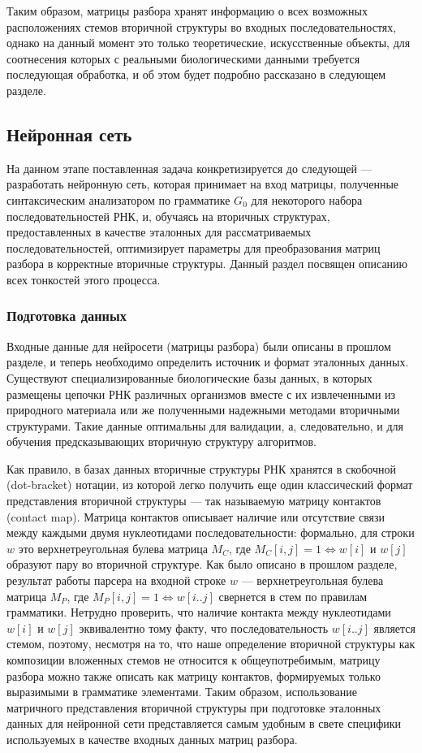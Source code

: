 Таким образом, матрицы разбора хранят информацию о всех возможных расположениях стемов вторичной структуры во входных последовательностях, однако на данный момент это только теоретические, искусственные объекты, для соотнесения которых с реальными биологическими данными требуется последующая обработка, и об этом будет подробно рассказано в следующем разделе.

\subsection{Нейронная сеть}
На данном этапе поставленная задача конкретизируется до следующей --- разработать нейронную сеть, которая принимает на вход матрицы, полученные синтаксическим анализатором по грамматике $G_0$ для некоторого набора последовательностей РНК, и, обучаясь на вторичных структурах, предоставленных в качестве эталонных для рассматриваемых последовательностей, оптимизирует параметры для преобразования матриц разбора в корректные вторичные структуры. Данный раздел посвящен описанию всех тонкостей этого процесса. 
\subsubsection{Подготовка данных} 
Входные данные для нейросети (матрицы разбора) были описаны в прошлом разделе, и теперь необходимо определить источник и формат эталонных данных. Существуют специализированные биологические базы данных, в которых размещены цепочки РНК различных организмов вместе с их извлеченными из природного материала или же полученными надежными методами вторичными структурами. Такие данные оптимальны для валидации, а, следовательно, и для обучения предсказывающих вторичную структуру алгоритмов. 

Как правило, в базах данных вторичные структуры РНК хранятся в скобочной (dot-bracket) нотации, из которой легко получить еще один классический формат  представления вторичной структуры --- так называемую матрицу контактов (contact map). Матрица контактов описывает наличие или отсутствие связи между каждыми двумя нуклеотидами последовательности: формально, для строки $w$ это верхнетреугольная булева матрица $M_C$, где $M_C[i,j]=1 \iff w[i]$ и $w[j]$ образуют пару во вторичной структуре. Как было описано в прошлом разделе, результат работы парсера на входной строке $w$ --- верхнетреугольная булева матрица $M_P$, где $M_P[i,j]=1 \iff w[i..j]$ свернется в стем по правилам грамматики. Нетрудно проверить, что наличие контакта между нуклеотидами $w[i]$ и $w[j]$ эквивалентно тому факту, что последовательность $w[i..j]$ является стемом, поэтому, несмотря на то, что наше определение вторичной структуры как композиции вложенных стемов не относится к общеупотребимым, матрицу разбора можно также описать как матрицу контактов, формируемых только выразимыми в грамматике элементами. Таким образом, использование матричного представления вторичной структуры при подготовке эталонных данных для нейронной сети представляется самым удобным в свете специфики используемых в качестве входных данных матриц разбора. 

